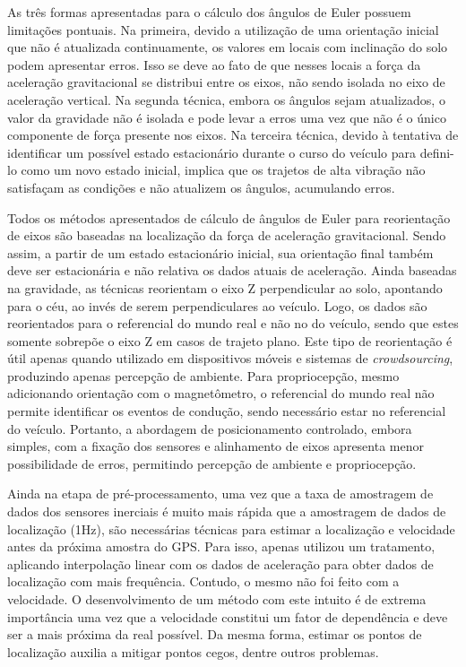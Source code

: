 As três formas apresentadas para o cálculo dos ângulos de Euler possuem limitações pontuais. Na primeira, devido a utilização de uma orientação inicial que não é atualizada continuamente, os valores em locais com inclinação do solo podem apresentar erros. Isso se deve ao fato de que nesses locais a força da aceleração gravitacional se distribui entre os eixos, não sendo isolada no eixo de aceleração vertical. Na segunda técnica, embora os ângulos sejam atualizados, o valor da gravidade não é isolada e pode levar a erros uma vez que não é o único componente de força presente nos eixos. Na terceira técnica, devido à tentativa de identificar um possível estado estacionário durante o curso do veículo para defini-lo como um novo estado inicial, implica que os trajetos de alta vibração não satisfaçam as condições e não atualizem os ângulos, acumulando erros. 

Todos os métodos apresentados de cálculo de ângulos de Euler para reorientação de eixos são baseadas na localização da força de aceleração gravitacional. Sendo assim, a partir de um estado estacionário inicial, sua orientação final também deve ser estacionária e não relativa os dados atuais de aceleração. Ainda baseadas na gravidade, as técnicas reorientam o eixo Z perpendicular ao solo, apontando para o céu, ao invés de serem perpendiculares ao veículo. Logo, os dados são reorientados para o referencial do mundo real e não no do veículo, sendo que estes somente sobrepõe o eixo Z em casos de trajeto plano. Este tipo de reorientação é útil apenas quando utilizado em dispositivos móveis e sistemas de \textit{crowdsourcing}, produzindo apenas percepção de ambiente. Para propriocepção, mesmo adicionando orientação com o magnetômetro, o referencial do mundo real não permite identificar os eventos de condução, sendo necessário estar no referencial do veículo. Portanto, a abordagem de posicionamento controlado, embora simples, com a fixação dos sensores e alinhamento de eixos apresenta menor possibilidade de erros, permitindo percepção de ambiente e propriocepção.

Ainda na etapa de pré-processamento, uma vez que a taxa de amostragem de dados dos sensores inerciais é muito mais rápida que a amostragem de dados de localização (1Hz), são necessárias técnicas para estimar a localização e velocidade antes da próxima amostra do GPS. Para isso, apenas \cite{Li2018} utilizou um tratamento, aplicando interpolação linear com os dados de aceleração para obter dados de localização com mais frequência. Contudo, o mesmo não foi feito com a velocidade. O desenvolvimento de um método com este intuito é de extrema importância uma vez que a velocidade constitui um fator de dependência e deve ser a mais próxima da real possível. Da mesma forma, estimar os pontos de localização auxilia a mitigar pontos cegos, dentre outros problemas.

